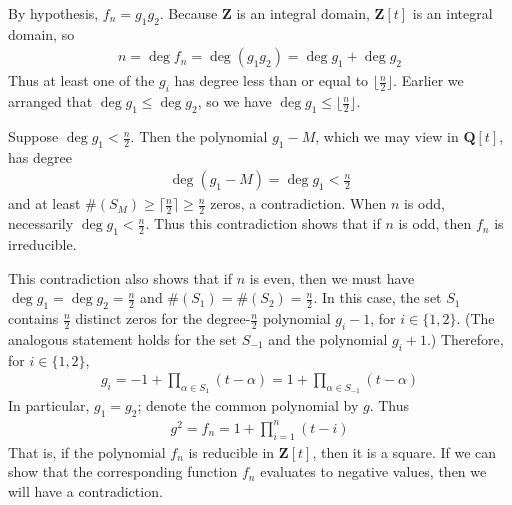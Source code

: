 \documentclass[oneside, english, 11pt]{article}
\newcommand{\integers}{\mathbf{Z}}
\newcommand{\order}{\#}
\newcommand{\Q}{\rationals}
\newcommand{\rationals}{\mathbf{Q}}
\newcommand{\Z}{\integers}
\begin{document}
{By hypothesis, $f_{n} = g_{1} g_{2}$. Because $\Z$ is an integral domain, $\Z[t]$ is an integral domain, so
\begin{align*}
n
=
\deg f_{n}
=
\deg(g_{1} g_{2})
=
\deg g_{1} + \deg g_{2}
\end{align*}
Thus at least one of the $g_{i}$ has degree less than or equal to $\lfloor{}\frac{n}{2}\rfloor{}$. Earlier we arranged that $\deg g_{1} \leq \deg g_{2}$, so we have $\deg g_{1} \leq \lfloor{}\frac{n}{2}\rfloor{}$.

Suppose $\deg g_{1} < \frac{n}{2}$. Then the polynomial $g_{1} - M$, which we may view in $\Q[t]$, has degree
\begin{align*}
\deg(g_{1} - M)
=
\deg g_{1}
<
\frac{n}{2}
\end{align*}
and at least $\order(S_{M}) \geq \lceil{}\frac{n}{2}\rceil{} \geq \frac{n}{2}$ zeros, a contradiction. When $n$ is odd, necessarily $\deg g_{1} < \frac{n}{2}$. Thus this contradiction shows that if $n$ is odd, then $f_{n}$ is irreducible.

This contradiction also shows that if $n$ is even, then we must have $\deg g_{1} = \deg g_{2} = \frac{n}{2}$ and $\order(S_{1}) = \order(S_{2}) = \frac{n}{2}$. In this case, the set $S_{1}$ contains $\frac{n}{2}$ distinct zeros for the degree-$\frac{n}{2}$ polynomial $g_{i} - 1$, for $i \in \{1, 2\}$. (The analogous statement holds for the set $S_{-1}$ and the polynomial $g_{i} + 1$.) Therefore, for $i \in \{1, 2\}$,
\begin{align*}
g_{i}
=
-1 + \prod_{\alpha \in S_{1}} (t - \alpha)
=
1 + \prod_{\alpha \in S_{-1}} (t - \alpha)
\end{align*}
In particular, $g_{1} = g_{2}$; denote the common polynomial by $g$. Thus
\begin{align*}
g^{2}
=
f_{n}
=
1 + \prod_{i = 1}^{n} (t - i)
\end{align*}
That is, if the polynomial $f_{n}$ is reducible in $\Z[t]$, then it is a square. If we can show that the corresponding function $f_{n}$ evaluates to negative values, then we will have a contradiction.

}
\end{document}
